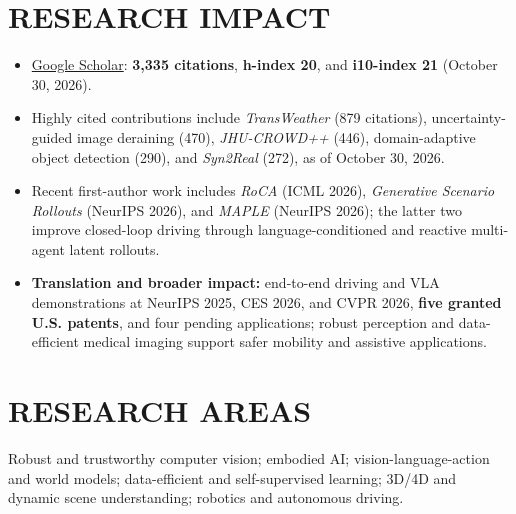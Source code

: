 \documentclass[margin,11pt]{resume}
\begin{document}
\section{\footnotesize {\large R}ESEARCH {\large I}MPACT}
\begin{itemize}[leftmargin=*,itemsep=1pt,topsep=2pt]
    \item \href{https://scholar.google.com/citations?user=R8dwrxEAAAAJ&hl=en}{Google Scholar}: \textbf{3,335 citations}, \textbf{h-index 20}, and \textbf{i10-index 21} (October 30, 2026).
    \item Highly cited contributions include \textit{TransWeather} (879 citations), uncertainty-guided image deraining (470), \textit{JHU-CROWD++} (446), domain-adaptive object detection (290), and \textit{Syn2Real} (272), as of October 30, 2026.
    \item Recent first-author work includes \textit{RoCA} (ICML 2026), \textit{Generative Scenario Rollouts} (NeurIPS 2026), and \textit{MAPLE} (NeurIPS 2026); the latter two improve closed-loop driving through language-conditioned and reactive multi-agent latent rollouts.
    \item \textbf{Translation and broader impact:} end-to-end driving and VLA demonstrations at NeurIPS 2025, CES 2026, and CVPR 2026, \textbf{five granted U.S. patents}, and four pending applications; robust perception and data-efficient medical imaging support safer mobility and assistive applications.
\end{itemize}

\vspace{-0.8em}
\section{\footnotesize {\large R}ESEARCH {\large A}REAS}
Robust and trustworthy computer vision; embodied AI; vision-language-action and world models; data-efficient and self-supervised learning; 3D/4D and dynamic scene understanding; robotics and autonomous driving.

\vspace{-0.7em}
\end{document}
